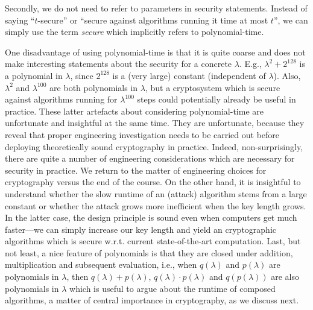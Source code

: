Secondly, we do not need to refer to parameters in security statements. Instead of saying ``$t$-secure'' or ``secure against algorithms running it time at most $t$'', we can simply use the term \emph{secure} which implicitly refers to polynomial-time.

One disadvantage of using polynomial-time is that it is quite coarse and does not make interesting statements about the security for a concrete $\lambda$. E.g., $\lambda^2+2^{128}$ is a polynomial in $\lambda$, since $2^{128}$ is a (very large) constant (independent of $\lambda$). Also, $\lambda^2$ and $\lambda^{100}$ are both polynomials in $\lambda$, but a cryptosystem which is secure against algorithms running for $\lambda^{100}$ steps could potentially already be useful in practice. These latter artefacts about considering polynomial-time are unfortunate and insightful at the same time. They are unfortunate, because they reveal that proper engineering investigation needs to be carried out before deploying theoretically sound cryptography in practice. Indeed, non-surprisingly, there are quite a number of engineering considerations which are necessary for security in practice. We return to the matter of engineering choices for cryptography versus the end of the course.
On the other hand, it is insightful to understand whether the slow runtime of an (attack) algorithm stems from a large constant or whether the attack grows more inefficient when the key length grows. In the latter case, the design principle is sound even when computers get much faster---we can simply increase our key length and yield an cryptographic algorithms which is secure w.r.t. current state-of-the-art computation. Last, but not least, a nice feature of polynomials is that they are closed under addition, multiplication and subsequent evaluation, i.e., when $q(\lambda)$ and $p(\lambda)$ are polynomials in $\lambda$, then $q(\lambda)+p(\lambda)$, $q(\lambda)\cdot p(\lambda)$ and $q(p(\lambda))$ are also polynomials in $\lambda$ which is useful to argue about the runtime of composed algorithms, a matter of central importance in cryptography, as we discuss next.

